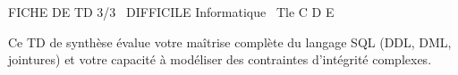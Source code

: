 \documentclass[11pt]{article}
\begin{document}
\begin{tcolorbox}[enhanced,colback=popink,colframe=popink,arc=10pt,boxrule=0pt,left=12pt,right=12pt,top=9pt,bottom=9pt]
{\color{white}\popxbold\small FICHE DE TD 3/3 \textbullet\ DIFFICILE \hfill Informatique \textbullet\ Tle C D E\par}
\end{tcolorbox}
\vspace{4pt}
Ce TD de synthèse évalue votre maîtrise complète du langage SQL (DDL, DML, jointures) et votre capacité à modéliser des contraintes d'intégrité complexes.
\end{document}
